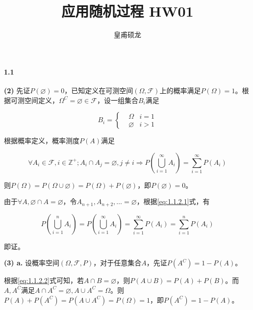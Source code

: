 \documentclass{article}
\title{应用随机过程 HW01}
\author{皇甫硕龙}
\begin{document}
    \maketitle
    \paragraph*{1.1} \textbf{(2)} 先证$P(\varnothing) = 0$，已知定义在可测空间$(\Omega, \mathcal F)$上的概率满足$P(\Omega) = 1$。根据可测空间定义，$\Omega^C = \varnothing \in \mathcal F$，设一组集合$B_i$满足

    \begin{equation}
        B_i = \left\{\begin{aligned}
            & \Omega & i = 1 \\
            & \varnothing & i > 1
        \end{aligned}\right.
    \end{equation}

    根据概率定义，概率测度$P(A)$满足

    \begin{equation}
        \forall A_i \in \mathcal{F}, i\in \mathbb{Z}^+; A_i\cap A_j =\varnothing, j\not = i \Rightarrow P\left(\bigcup _{i=1}^\infty  A_i \right)=\sum_{i=1}^\infty P\left(A_i\right)
        \label{eq:1.1.2.1}
    \end{equation}

    则$P(\Omega) =  P(\Omega \cup \varnothing) = P(\Omega) + P(\varnothing)$，即$P(\varnothing) = 0$。
    
    由于$\forall A, \varnothing \cap A = \varnothing$，令$A_{n+1}, A_{n+2}, \dots = \varnothing$，根据\ref{eq:1.1.2.1}式，有

    \begin{equation}
        P\left(\bigcup_{i=1}^n A_i\right) = P\left(\bigcup_{i=1}^\infty A_i\right) = \sum_{i=1}^\infty P\left(A_i\right) = \sum_{i=1}^n P\left(A_i\right)
        \label{eq:1.1.2.2}
    \end{equation}

    即证。

    \textbf{(3) a.} 设概率空间$(\Omega, \mathcal F, P)$，对于任意集合$A$，先证$P\left(A^C\right) = 1 - P(A)$。

    根据\ref{eq:1.1.2.2}式可知，若$A\cap B = \varnothing$，则$P(A\cup B) = P(A) + P(B)$。而$A, A^C$满足$A\cap A^C = \varnothing, A\cup A^C = \Omega$。则$P(A) + P\left(A^C\right) = P\left(A\cup A^C\right) = P(\Omega) = 1$，即$P\left(A^C\right) = 1 - P(A)$。
\end{document}

